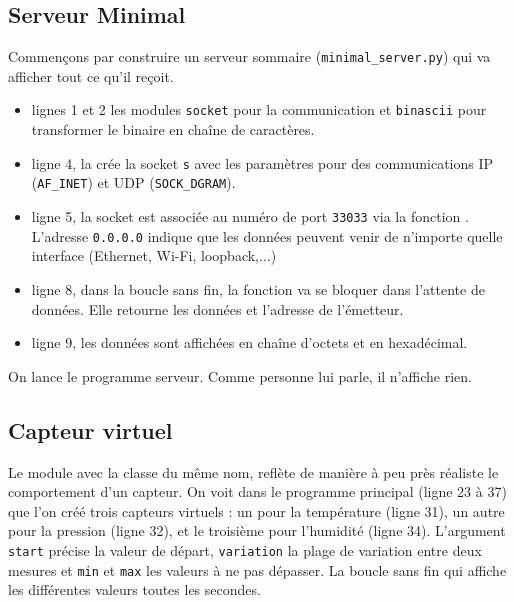 \subsection{Serveur Minimal}



Commençons par construire un serveur sommaire (\texttt{minimal\_server.py}) qui va afficher tout ce qu'il reçoit. 
\begin{itemize}
    \item lignes 1 et 2 les modules \texttt{socket} pour la communication et \texttt{binascii} pour transformer le binaire en chaîne de caractères.
    \item ligne 4, la  crée la socket \texttt{s} avec les paramètres pour des communications IP (\texttt{AF\_INET}) et UDP (\texttt{SOCK\_DGRAM}).
    \item ligne 5, la socket est associée au numéro de port \texttt{33033} via la fonction . L'adresse \texttt{0.0.0.0} indique que les données peuvent venir de n'importe quelle interface (Ethernet, Wi-Fi, loopback,...) 
    \item ligne 8, dans la boucle sans fin, la fonction  va se bloquer dans l'attente de données. Elle retourne les données et l'adresse de l'émetteur.
    \item ligne 9, les données sont affichées en chaîne d'octets et en hexadécimal.
    
\end{itemize}

     \vspace{1em}

On lance le programme serveur. Comme personne lui parle, il n'affiche rien. 

\subsection{Capteur virtuel}


Le module  avec la classe du même nom, reflète de manière à peu près réaliste le comportement d'un capteur. On voit dans le programme principal (ligne 23 à 37) que l'on créé trois capteurs virtuels : un pour la température (ligne 31), un autre pour la pression (ligne 32), et le troisième pour l'humidité (ligne 34). L'argument \texttt{start} précise la valeur de départ, \texttt{variation} la plage de variation entre deux mesures et \texttt{min} et \texttt{max} les valeurs à ne pas dépasser. La boucle sans fin qui affiche les différentes valeurs toutes les secondes.

